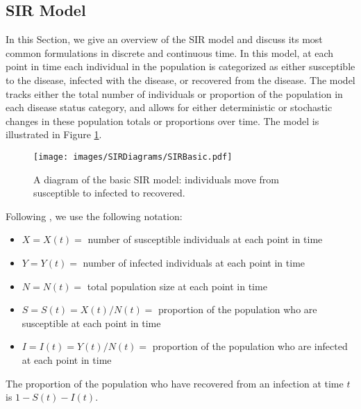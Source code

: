 \documentclass[fleqn]{article}\usepackage[]{graphicx}\usepackage[]{color}
\begin{document}
\subsection{SIR Model}
\label{subsec:ModelFormulation:SIR}

In this Section, we give an overview of the SIR model and discuss its most common formulations in discrete and continuous time.  In this model, at each point in time each individual in the population is categorized as either susceptible to the disease, infected with the disease, or recovered from the disease.  The model tracks either the total number of individuals or proportion of the population in each disease status category, and allows for either deterministic or stochastic changes in these population totals or proportions over time.  The model is illustrated in Figure \ref{fig:SIRBasic}.

\begin{figure}
\texttt{[image: images/SIRDiagrams/SIRBasic.pdf]}
\caption{A diagram of the basic SIR model: individuals move from susceptible to infected to recovered.}
\label{fig:SIRBasic}
\end{figure}

Following \cite{keeling2008modelingInfectiousDiseases}, we use the following notation:
\begin{itemize}
\item $X = X(t) = $ number of susceptible individuals at each point in time
\item $Y = Y(t) = $ number of infected individuals at each point in time
\item $N = N(t) = $ total population size at each point in time
\item $S = S(t) = X(t) / N(t) =$ proportion of the population who are susceptible at each point in time
\item $I = I(t) = Y(t) / N(t) =$ proportion of the population who are infected at each point in time
\end{itemize}
The proportion of the population who have recovered from an infection at time $t$ is $1 - S(t) - I(t)$.


\end{document}

